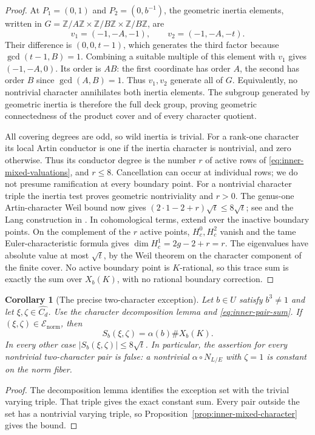 \documentclass[11pt]{article}
\newtheorem{corollary}[theorem]{Corollary}
\begin{document}
\begin{proof}
At $P_1=(0,1)$ and $P_2=(0,b^{-1})$, the geometric inertia
elements, written in $G=\mathbb Z/A\mathbb Z\times
\mathbb Z/B\mathbb Z\times\mathbb Z/B\mathbb Z$, are
\[
 v_1=(-1,-A,-1),\qquad v_2=(-1,-A,-t).
\]
Their difference is $(0,0,t-1)$, which generates the third
factor because $\gcd(t-1,B)=1$. Combining a suitable multiple of
this element with $v_1$ gives $(-1,-A,0)$. Its order is $AB$:
the first coordinate has order $A$, the second has order $B$
since $\gcd(A,B)=1$. Thus $v_1,v_2$ generate all of $G$.
Equivalently, no nontrivial character annihilates both inertia
elements. The subgroup generated by geometric inertia is therefore
the full deck group, proving geometric connectedness of the product
cover and of every character quotient.

All covering degrees are odd, so wild inertia is trivial.
For a rank-one character its local Artin conductor is one if
the inertia character is nontrivial, and zero otherwise.
Thus its conductor degree is the number $r$ of active rows of
\eqref{eq:inner-mixed-valuations}, and $r\le8$.
Cancellation can occur at individual rows; we do not presume
ramification at every boundary point. For a nontrivial character
triple the inertia test proves geometric nontriviality and $r>0$.
The genus-one Artin-character Weil bound now gives
$(2\cdot1-2+r)\sqrt t\le8\sqrt t$; see
\cite[\S4, Lemma~1]{FFSTV13} and the Lang construction in
\cite[pp.~198--199]{Katz89}.
In cohomological terms, extend over the inactive boundary points.
On the complement of the $r$ active points, $H_c^0,H_c^2$ vanish
and the tame Euler-characteristic formula gives
$\dim H_c^1=2g-2+r=r$.
The eigenvalues have absolute value at most $\sqrt t$, by the
Weil theorem on the character component of the finite cover.
No active boundary point is $K$-rational, so this trace sum is
exactly the sum over $X_b(K)$, with no rational boundary correction.
\end{proof}

\begin{corollary}[The precise two-character exception]
\label{cor:inner-mixed-exception}
Let $b\in U$ satisfy $b^3\ne1$ and let $\xi,\zeta\in\widehat{C_d}$.
Use the character decomposition lemma and \eqref{eq:inner-pair-sum}.
If $(\xi,\zeta)\in\mathcal E_{\mathrm{norm}}$, then
\[
 S_b(\xi,\zeta)=\alpha(b)\#X_b(K).
\]
In every other case $|S_b(\xi,\zeta)|\le8\sqrt t$.
In particular, the assertion for every nontrivial two-character
pair is false: a nontrivial $\alpha\circ N_{L/E}$ with $\zeta=1$
is constant on the norm fiber.
\end{corollary}
\begin{proof}
The decomposition lemma identifies the exception set with the
trivial varying triple. That triple gives the exact constant sum.
Every pair outside the set has a nontrivial varying triple, so
Proposition~\ref{prop:inner-mixed-character} gives the bound.
\end{proof}
\end{document}
